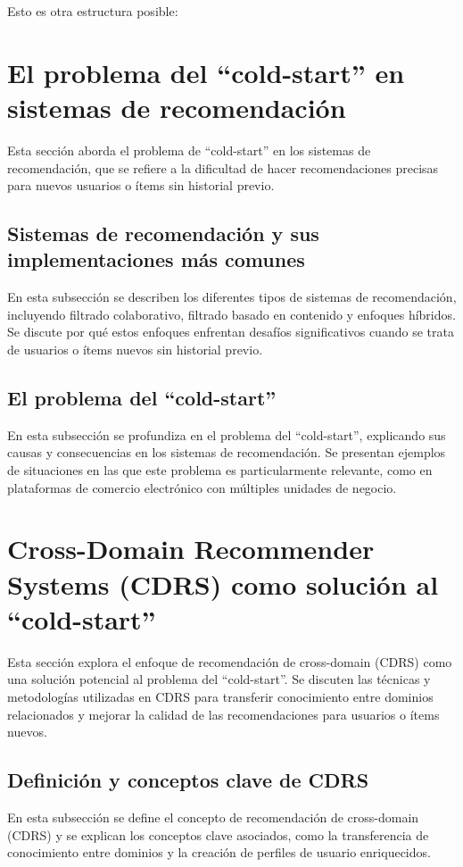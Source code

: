 \newpage

Esto es otra estructura posible:

\section{El problema del \enquote{cold-start} en sistemas de recomendación}
	Esta sección aborda el problema de \enquote{cold-start} en los sistemas de recomendación, que se refiere a la dificultad de hacer recomendaciones precisas para nuevos usuarios o ítems sin historial previo.

	\subsection{Sistemas de recomendación y sus implementaciones más comunes}
		En esta subsección se describen los diferentes tipos de sistemas de recomendación, incluyendo filtrado colaborativo, filtrado basado en contenido y enfoques híbridos. Se discute por qué estos enfoques enfrentan desafíos significativos cuando se trata de usuarios o ítems nuevos sin historial previo.

	\subsection{El problema del \enquote{cold-start}}
		En esta subsección se profundiza en el problema del \enquote{cold-start}, explicando sus causas y consecuencias en los sistemas de recomendación. Se presentan ejemplos de situaciones en las que este problema es particularmente relevante, como en plataformas de comercio electrónico con múltiples unidades de negocio.

\section{Cross-Domain Recommender Systems (CDRS) como solución al \enquote{cold-start}}
	Esta sección explora el enfoque de recomendación de cross-domain (CDRS) como una solución potencial al problema del \enquote{cold-start}. Se discuten las técnicas y metodologías utilizadas en CDRS para transferir conocimiento entre dominios relacionados y mejorar la calidad de las recomendaciones para usuarios o ítems nuevos.

	\subsection{Definición y conceptos clave de CDRS}
		En esta subsección se define el concepto de recomendación de cross-domain (CDRS) y se explican los conceptos clave asociados, como la transferencia de conocimiento entre dominios y la creación de perfiles de usuario enriquecidos.

